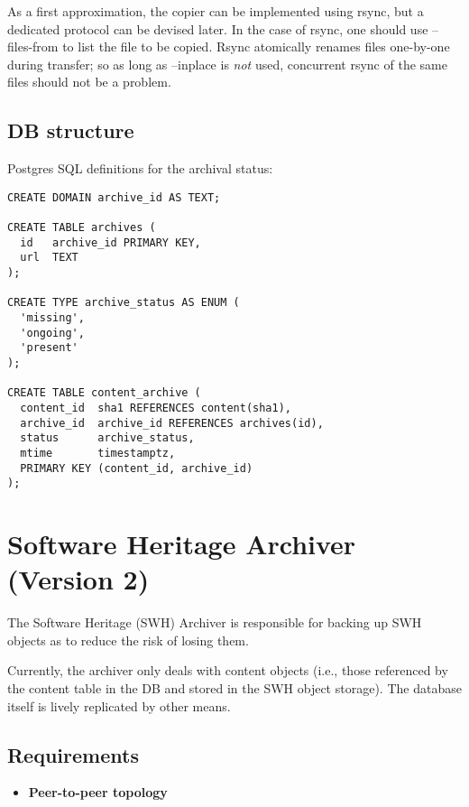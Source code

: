 As a first approximation, the copier can be implemented using rsync, but
a dedicated protocol can be devised later. In the case of rsync, one
should use --files-from to list the file to be copied. Rsync atomically
renames files one-by-one during transfer; so as long as --inplace is
\emph{not} used, concurrent rsync of the same files should not be a
problem.

\subsection{DB structure}\label{db-structure}

Postgres SQL definitions for the archival status:

\begin{verbatim}
CREATE DOMAIN archive_id AS TEXT;

CREATE TABLE archives (
  id   archive_id PRIMARY KEY,
  url  TEXT
);

CREATE TYPE archive_status AS ENUM (
  'missing',
  'ongoing',
  'present'
);

CREATE TABLE content_archive (
  content_id  sha1 REFERENCES content(sha1),
  archive_id  archive_id REFERENCES archives(id),
  status      archive_status,
  mtime       timestamptz,
  PRIMARY KEY (content_id, archive_id)
);
\end{verbatim}

\section{Software Heritage Archiver (Version
2)}\label{software-heritage-archiver-version-2}

The Software Heritage (SWH) Archiver is responsible for backing up SWH
objects as to reduce the risk of losing them.

Currently, the archiver only deals with content objects (i.e., those
referenced by the content table in the DB and stored in the SWH object
storage). The database itself is lively replicated by other means.

\subsection{Requirements}\label{requirements-1}

\begin{itemize}
\itemsep1pt\parskip0pt
\item
  \textbf{Peer-to-peer topology}
\end{itemize}

